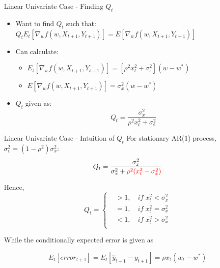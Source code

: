 \documentclass{beamer}
\begin{document}
\begin{frame}{Linear Univariate Case - Finding $Q_t$}
    \begin{itemize}
        \item Want to find $Q_t$ such that: $Q_tE_t[\nabla_w f(w,X_{t+1},Y_{t+1})]=E[\nabla_w f(w,X_{t+1},Y_{t+1})]$
        \newline
        \item Can calculate:
        \begin{itemize}
            \item $E_t[\nabla_w f(w,X_{t+1},Y_{t+1})]=[\rho^2x_t^2+\sigma_\epsilon^2](w-w^*)$
            \item $E[\nabla_w f(w,X_{t+1},Y_{t+1})]=\sigma_x^2(w-w^*)$
            \newline
        \end{itemize}
        \item $Q_t$ given as:\\
        \begin{equation*}
            Q_t = \frac{\sigma_x^2}{\rho^2x_t^2+\sigma_\epsilon^2}
        \end{equation*}
    \end{itemize}
\end{frame}

\begin{frame}{Linear Univariate Case - Intuition of $Q_t$}
For stationary AR(1) process, $\sigma_\epsilon^2=(1-\rho^2)\sigma_x^2$:
\begin{equation*}
    Q_t = \frac{\sigma_x^2}{\sigma_x^2 + \textcolor{red}{\rho^2(x_t^2-\sigma_x^2)}}
\end{equation*}

Hence,
\begin{equation*}
    Q_t=\begin{cases}
        &>1, \quad if\; x_t^2<\sigma_x^2\\
        &=1, \quad if\; x_t^2=\sigma_x^2\\
        &<1, \quad if\; x_t^2>\sigma_x^2\\
    \end{cases}
\end{equation*}

While the conditionally expected error is given as

\begin{equation*}
    E_t[error_{t+1}]=E_t[\hat{y}_{t+1}-y_{t+1}]=\rho x_t(w_t-w^*)
\end{equation*}

    
\end{frame}
\end{document}
